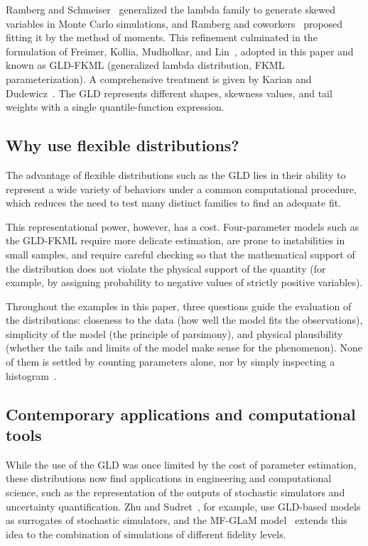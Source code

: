 Ramberg and Schmeiser~\cite{ramberg1974} generalized the lambda family to generate skewed variables in Monte Carlo simulations, and Ramberg and coworkers~\cite{ramberg1979} proposed fitting it by the method of moments. This refinement culminated in the formulation of Freimer, Kollia, Mudholkar, and Lin~\cite{freimer1988}, adopted in this paper and known as GLD-FKML (generalized lambda distribution, FKML parameterization). A comprehensive treatment is given by Karian and Dudewicz~\cite{karian2011}. The GLD represents different shapes, skewness values, and tail weights with a single quantile-function expression.

\subsection{Why use flexible distributions?}

The advantage of flexible distributions such as the GLD lies in their ability to represent a wide variety of behaviors under a common computational procedure, which reduces the need to test many distinct families to find an adequate fit.

This representational power, however, has a cost. Four-parameter models such as the GLD-FKML require more delicate estimation, are prone to instabilities in small samples, and require careful checking so that the mathematical support of the distribution does not violate the physical support of the quantity (for example, by assigning probability to negative values of strictly positive variables).

Throughout the examples in this paper, three questions guide the evaluation of the distributions: closeness to the data (how well the model fits the observations), simplicity of the model (the principle of parsimony), and physical plausibility (whether the tails and limits of the model make sense for the phenomenon). None of them is settled by counting parameters alone, nor by simply inspecting a histogram~\cite{nist2012}.

\subsection{Contemporary applications and computational tools}

While the use of the GLD was once limited by the cost of parameter estimation, these distributions now find applications in engineering and computational science, such as the representation of the outputs of stochastic simulators and uncertainty quantification. Zhu and Sudret~\cite{zhu2021}, for example, use GLD-based models as surrogates of stochastic simulators, and the MF-GLaM model~\cite{giannoukou2026} extends this idea to the combination of simulations of different fidelity levels.

